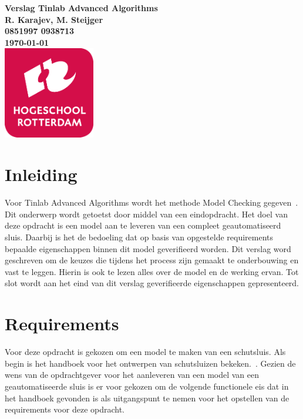 \documentclass{article}
\begin{document}
\sffamily
\begin{titlepage}
  \centering
    \vfill
    {
        \bfseries\Huge Verslag Tinlab Advanced Algorithms \\
        \vskip2cm
        }
        {\bfseries\Large
          R. Karajev, M. Steijger\\
        }
        {
          \bfseries\normalsize
          0851997 0938713\\
          \vskip1cm
          \today\\
    }    
    \vfill
    \includegraphics[width=4cm]{logohr.png} %
    \vfill
    \vfill
\end{titlepage}

\newpage
\tableofcontents


\newpage
\section{Inleiding}
    Voor Tinlab Advanced Algorithms wordt het methode Model Checking gegeven~\cite{modelchecking}. 
    Dit onderwerp wordt getoetst door middel van een eindopdracht. Het doel van deze 
    opdracht is een model aan te leveren van een compleet geautomatiseerd sluis. 
    Daarbij is het de bedoeling dat op basis van opgestelde requirements bepaalde 
    eigenschappen binnen dit model geverifieerd worden. Dit verslag word geschreven 
    om de keuzes die tijdens het process zijn gemaakt te onderbouwing en vast te leggen.
    Hierin is ook te lezen alles over de model en de werking ervan. Tot slot wordt
    aan het eind van dit verslag geverifieerde eigenschappen gepresenteerd.

\newpage
\section {Requirements}
    Voor deze opdracht is gekozen om een model te maken van een schutsluis.
    Als begin is het handboek voor het ontwerpen van schutsluizen bekeken.~\cite{ontwerpSchutsluizen}.
    Gezien de wens van de opdrachtgever voor het aanleveren van een model van een
    geautomatiseerde sluis is er voor gekozen om de volgende functionele eis dat in 
    het handboek gevonden is als uitgangspunt te nemen voor het opstellen van de 
    requirements voor deze opdracht. \\
\end{document}

